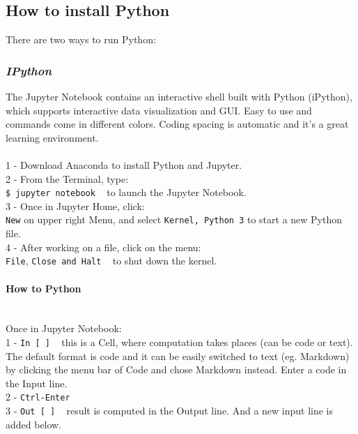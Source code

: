 \documentclass{article}
\begin{document}
\subsection{How to install Python}
There are two ways to run Python:
\subsubsection{\small\textsl{IPython }}

The Jupyter Notebook contains an interactive shell built with Python (iPython), which supports interactive data visualization and GUI. Easy to use and commands come in different colors. Coding spacing is automatic and it's a great learning environment.\\
\\
1 - Download Anaconda to install Python and Jupyter. \\
2 - From the Terminal, type:\\
\texttt{\$ jupyter notebook} ~ to launch the Jupyter Notebook.\\
3 - Once in Jupyter Home, click:\\
\texttt{New} on upper right Menu, and select \texttt{Kernel, Python 3} to start a new Python file.\\
4 - After working on a file, click on the menu: \\
\texttt{File}, \texttt{Close and Halt} ~ to shut down the kernel.

\paragraph{\textbf{How to Python}}\\
Once in Jupyter Notebook:\\
1 - \texttt{In [~]} ~ this is a Cell, where computation takes places (can be code or text). The default format is code and it can be easily switched to text (eg. Markdown) by clicking the menu bar of Code and chose Markdown instead. Enter a code in the Input line.\\
2 - \texttt{Ctrl-Enter} \\
3 - \texttt{Out [~]} ~ result is computed in the Output line. And a new input line is added below. 
\end{document}
